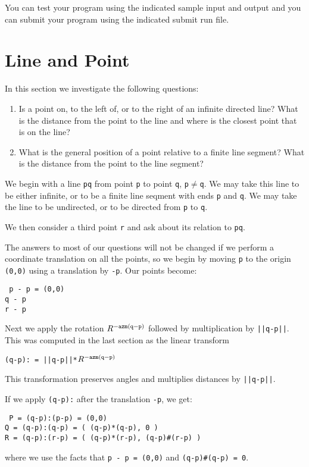 \documentclass[12pt]{article}
\begin{document}
You can test your program using the indicated sample input and
output and you can submit your program using the indicated submit
run file.

\newpage

\section{Line and Point}\label{LINE-AND-POINT}
In this section we investigate the following questions:
\begin{enumerate}
\item Is a point on, to the left of, or to the right of
an infinite directed line?  What is the distance from the
point to the line and where is the closest point that is
on the line?
\item What is the general position of a point relative
to a finite line segment?  What is the distance from the
point to the line segment?
\end{enumerate}

We begin with a line {\tt pq} from point {\tt p} to point {\tt q},
{\tt p$\neq$q}.
We may take this line to be either infinite, or to be a finite
line seqment with ends {\tt p} and {\tt q}.  We may take the
line to be undirected, or to be directed from {\tt p} to {\tt q}.

We then consider a third point {\tt r} and ask about its relation
to {\tt pq}.

The answers to most of our questions will not be changed if we perform
a coordinate translation on all the points, so we begin by moving
{\tt p} to the origin {\tt (0,0)} using a translation by {\tt -p}.
Our points become:
\begin{center} \tt
p - p = (0,0) \\
q - p \\
r - p
\end{center}
Next we apply the rotation $R^{\tt -azm(q-p)}$
followed by multiplication by {\tt ||q-p||}.  This was computed
in the last section as the linear transform \\
\centerline{\tt (q-p): = ||q-p||*$R^{\tt -azm(q-p)}$}
This transformation preserves angles and multiplies distances by {\tt ||q-p||}.

If we apply {\tt (q-p):} after the translation {\tt -p}, we get:
\begin{center} \tt
P = (q-p):(p-p) = (0,0) \\
Q = (q-p):(q-p) = ( (q-p)*(q-p), 0 ) \\
R = (q-p):(r-p) = ( (q-p)*(r-p), (q-p)\#(r-p) )
\end{center}
where we use the facts that {\tt p - p = (0,0)} and
{\tt (q-p)\#(q-p) = 0}.
\end{document}
